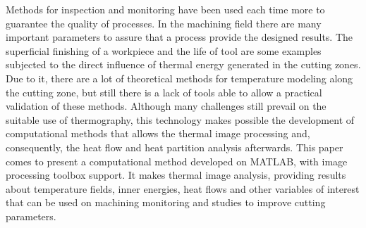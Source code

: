 	Methods for inspection and monitoring have been used each time more to guarantee the quality of processes. In the machining field there are many important parameters to assure that a process provide the designed results. The superficial finishing of a workpiece and the life of tool are some examples subjected to the direct influence of thermal energy generated in the cutting zones. Due to it, there are a lot of theoretical methods for temperature modeling along the cutting zone, but still there is a lack of tools able to allow a practical validation of these methods. Although many challenges still prevail on the suitable use of thermography, this technology makes possible the development of computational methods that allows the thermal image processing and, consequently, the heat flow and heat partition analysis afterwards.
	This paper comes to present a computational method developed on MATLAB, with image processing toolbox support. It makes thermal image analysis, providing results about temperature fields, inner energies, heat flows and other variables of interest that can be used on machining monitoring and studies to improve cutting parameters.